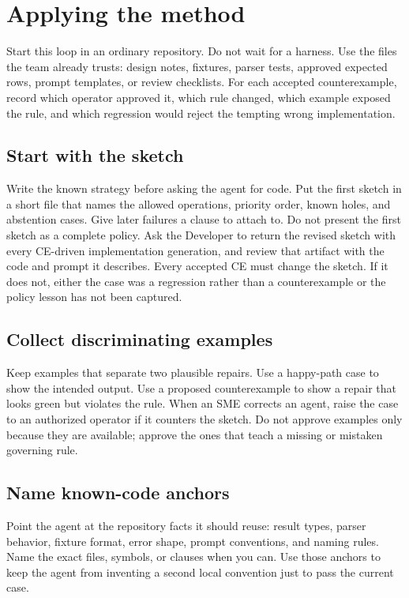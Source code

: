 \documentclass[11pt]{article}
\begin{document}
\section{Applying the method}
\label{sec:applying}

Start this loop in an ordinary repository.  Do not wait for a harness.  Use the files the team
already trusts: design notes, fixtures, parser tests, approved expected rows, prompt templates, or review
checklists.  For each accepted counterexample, record which operator approved it, which rule
changed, which example exposed the rule, and which regression would reject the tempting wrong
implementation.

\subsection{Start with the sketch}

Write the known strategy before asking the agent for code.  Put the first sketch in a short file that
names the allowed operations, priority order, known holes, and abstention cases.  Give later
failures a clause to attach to.  Do not present the first sketch as a complete policy.  Ask the
Developer to return the revised sketch with every CE-driven implementation generation, and
review that artifact with the code and prompt it describes.  Every accepted CE must change the
sketch.  If it does not, either the case was a regression rather than a counterexample or the
policy lesson has not been captured.

\subsection{Collect discriminating examples}

Keep examples that separate two plausible repairs.  Use a happy-path case to show the intended
output.  Use a proposed counterexample to show a repair that looks green but violates the rule.
When an SME corrects an agent, raise the case to an authorized operator if it counters the
sketch.  Do not approve examples only because they are available; approve the ones that teach a
missing or mistaken governing rule.

\subsection{Name known-code anchors}

Point the agent at the repository facts it should reuse: result types, parser behavior, fixture
format, error shape, prompt conventions, and naming rules.  Name the exact files, symbols, or
clauses when you can.  Use those anchors to keep the agent from inventing a second local
convention just to pass the current case.
\end{document}
